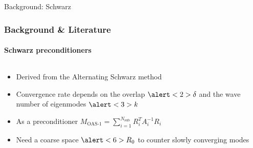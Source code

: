 \footerinfootnotestrue
\begin{frame}[label=background,fragile]{Background: Schwarz}
    \frametitle{Background \& Literature}
    \framesubtitle{Schwarz preconditioners}
    \begin{columns}[T,onlytextwidth]
        \begin{column}{.5\textwidth}
            \begin{itemize}
                \item<1-> Derived from the Alternating Schwarz method\cite{schwarz_methods_Dolean_2015}
                \item<2-> Convergence rate depends on the overlap $\alert<2>{\delta}$ and the wave number of eigenmodes $\alert<3>{k}$
                \item<4-> As a preconditioner $M_{\text{OAS-1}} = \sum_{i=1}^{N_{\text{sub}}} R_i^T A_i^{-1} R_i$
                \item<5-> Need a coarse space $\alert<6>{R_0}$ to counter slowly converging modes
            \end{itemize}
        \end{column}
        \begin{column}{.49\textwidth}
\end{column}
\end{columns}
\end{frame}
